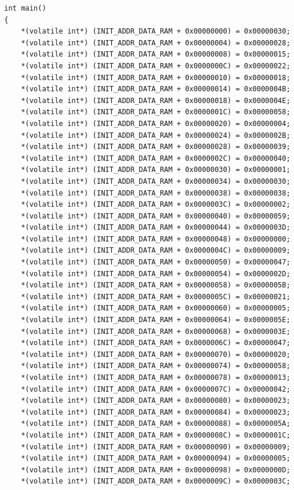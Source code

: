 \begin{lstlisting}
int main()
{
	*(volatile int*) (INIT_ADDR_DATA_RAM + 0x00000000) = 0x00000030;
	*(volatile int*) (INIT_ADDR_DATA_RAM + 0x00000004) = 0x00000028;
	*(volatile int*) (INIT_ADDR_DATA_RAM + 0x00000008) = 0x00000015;
	*(volatile int*) (INIT_ADDR_DATA_RAM + 0x0000000C) = 0x00000022;
	*(volatile int*) (INIT_ADDR_DATA_RAM + 0x00000010) = 0x00000018;
	*(volatile int*) (INIT_ADDR_DATA_RAM + 0x00000014) = 0x0000004B;
	*(volatile int*) (INIT_ADDR_DATA_RAM + 0x00000018) = 0x0000004E;
	*(volatile int*) (INIT_ADDR_DATA_RAM + 0x0000001C) = 0x00000058;
	*(volatile int*) (INIT_ADDR_DATA_RAM + 0x00000020) = 0x00000004;
	*(volatile int*) (INIT_ADDR_DATA_RAM + 0x00000024) = 0x0000002B;
	*(volatile int*) (INIT_ADDR_DATA_RAM + 0x00000028) = 0x00000039;
	*(volatile int*) (INIT_ADDR_DATA_RAM + 0x0000002C) = 0x00000040;
	*(volatile int*) (INIT_ADDR_DATA_RAM + 0x00000030) = 0x00000001;
	*(volatile int*) (INIT_ADDR_DATA_RAM + 0x00000034) = 0x00000030;
	*(volatile int*) (INIT_ADDR_DATA_RAM + 0x00000038) = 0x00000038;
	*(volatile int*) (INIT_ADDR_DATA_RAM + 0x0000003C) = 0x00000002;
	*(volatile int*) (INIT_ADDR_DATA_RAM + 0x00000040) = 0x00000059;
	*(volatile int*) (INIT_ADDR_DATA_RAM + 0x00000044) = 0x0000003D;
	*(volatile int*) (INIT_ADDR_DATA_RAM + 0x00000048) = 0x00000000;
	*(volatile int*) (INIT_ADDR_DATA_RAM + 0x0000004C) = 0x00000009;
	*(volatile int*) (INIT_ADDR_DATA_RAM + 0x00000050) = 0x00000047;
	*(volatile int*) (INIT_ADDR_DATA_RAM + 0x00000054) = 0x0000002D;
	*(volatile int*) (INIT_ADDR_DATA_RAM + 0x00000058) = 0x0000005B;
	*(volatile int*) (INIT_ADDR_DATA_RAM + 0x0000005C) = 0x00000021;
	*(volatile int*) (INIT_ADDR_DATA_RAM + 0x00000060) = 0x00000005;
	*(volatile int*) (INIT_ADDR_DATA_RAM + 0x00000064) = 0x0000005E;
	*(volatile int*) (INIT_ADDR_DATA_RAM + 0x00000068) = 0x0000003E;
	*(volatile int*) (INIT_ADDR_DATA_RAM + 0x0000006C) = 0x00000047;
	*(volatile int*) (INIT_ADDR_DATA_RAM + 0x00000070) = 0x00000020;
	*(volatile int*) (INIT_ADDR_DATA_RAM + 0x00000074) = 0x00000058;
	*(volatile int*) (INIT_ADDR_DATA_RAM + 0x00000078) = 0x00000013;
	*(volatile int*) (INIT_ADDR_DATA_RAM + 0x0000007C) = 0x00000042;
	*(volatile int*) (INIT_ADDR_DATA_RAM + 0x00000080) = 0x00000023;
	*(volatile int*) (INIT_ADDR_DATA_RAM + 0x00000084) = 0x00000023;
	*(volatile int*) (INIT_ADDR_DATA_RAM + 0x00000088) = 0x0000005A;
	*(volatile int*) (INIT_ADDR_DATA_RAM + 0x0000008C) = 0x0000001C;
	*(volatile int*) (INIT_ADDR_DATA_RAM + 0x00000090) = 0x00000009;
	*(volatile int*) (INIT_ADDR_DATA_RAM + 0x00000094) = 0x00000005;
	*(volatile int*) (INIT_ADDR_DATA_RAM + 0x00000098) = 0x0000000D;
	*(volatile int*) (INIT_ADDR_DATA_RAM + 0x0000009C) = 0x0000003C;

\end{lstlisting}
